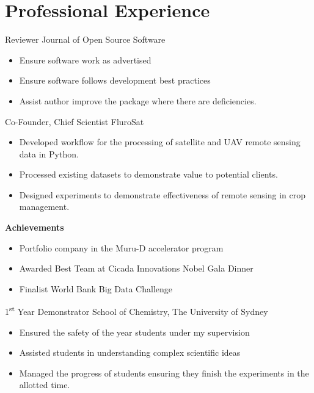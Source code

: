 \nocite{*}
\printbibliography[title={Selected Publications}]

\section{Professional Experience}

{Reviewer}
{Journal of Open Source Software}{}{}
{%
  \begin{itemize}
    \item Ensure software work as advertised
    \item Ensure software follows development best practices
    \item Assist author improve the package where there are deficiencies.
  \end{itemize}
}

{Co-Founder, Chief Scientist}
{FluroSat}{}{}
{%
  \begin{itemize}
    \item Developed workflow for the processing of satellite and UAV remote sensing data in Python.
    \item Processed existing datasets to demonstrate value to potential clients.
    \item Designed experiments to demonstrate effectiveness of remote sensing in crop management.
  \end{itemize}
  \textbf{Achievements}
  \begin{itemize}
    \item Portfolio company in the Muru-D accelerator program
    \item Awarded Best Team at Cicada Innovations Nobel Gala Dinner
    \item Finalist World Bank Big Data Challenge
  \end{itemize}
}
\vspace{1em}

{1\textsuperscript{st} Year Demonstrator}
{School of Chemistry, The University of Sydney}
{}{}
{%
  \begin{itemize}
    \item Ensured the safety of the  year students under my supervision
    \item Assisted students in understanding complex scientific ideas
    \item Managed the progress of students ensuring they finish the experiments in the allotted time.
  \end{itemize}
}
\vspace{1em}

